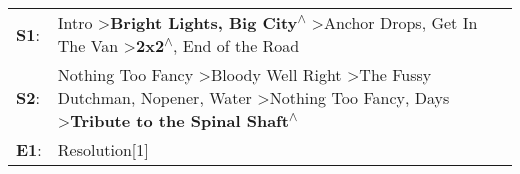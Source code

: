 \begin{supertabular}{p{0.03\textwidth}p{0.92\textwidth}}
 \textbf{S1}:  &                                                                                                  Intro\textsuperscript{} \textgreater \enspace \textbf{Bright Lights, Big City\textsuperscript{$\wedge$}} \textgreater \enspace Anchor Drops\textsuperscript{}, \enspace Get In The Van\textsuperscript{} \textgreater \enspace \textbf{2x2\textsuperscript{$\wedge$}}, \enspace End of the Road\textsuperscript{}  \enspace  \\
 \textbf{S2}:  &  Nothing Too Fancy\textsuperscript{} \textgreater \enspace Bloody Well Right\textsuperscript{} \textgreater \enspace The Fussy Dutchman\textsuperscript{}, \enspace Nopener\textsuperscript{}, \enspace Water\textsuperscript{} \textgreater \enspace Nothing Too Fancy\textsuperscript{},  Days\textsuperscript{} \textgreater \enspace \textbf{Tribute to the Spinal Shaft\textsuperscript{$\wedge$}}  \enspace  \\
 \textbf{E1}:  &                                                                                                                                                                                                                                                                                                                                                                                    Resolution[1]\textsuperscript{}  \enspace  \\
\end{supertabular}
